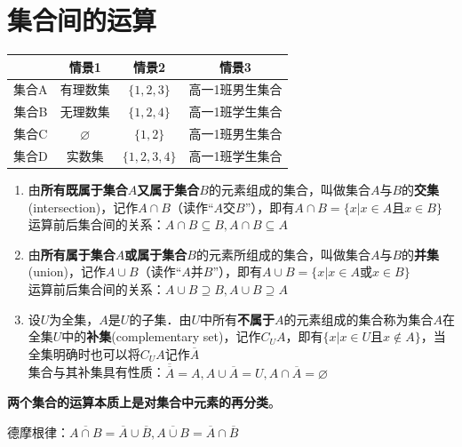 \section*{集合间的运算}
\begin{example}
    \begin{table}[h]
        \centering
        \begin{tabular}{cccc}
            \hline 
             & 情景1 & 情景2 & 情景3 \\
            \hline 
            集合A & 有理数集 & $\{1,2,3\}$ & 高一1班男生集合 \\
            集合B & 无理数集 & $\{1,2,4\}$ & 高一1班学生集合 \\
            集合C & $\varnothing$ & $\{1,2\}$ & 高一1班男生集合 \\
            集合D & 实数集 & $\{1,2,3,4\}$ & 高一1班学生集合\\
            \hline 
        \end{tabular}
    \end{table}
\end{example}
\begin{enumerate}
\item 由\textbf{所有既属于集合$A$又属于集合$B$}的元素组成的集合，叫做集合$A$与$B$的\textbf{交集}(intersection)，记作$A \cap B$（读作“$A$交$B$”），即有$A \cap B = \{x|x \in A \mbox{且} x \in B\}$ \\
运算前后集合间的关系：$A \cap B \subseteq B, A \cap B \subseteq A$
\item 由\textbf{所有属于集合$A$或属于集合$B$}的元素所组成的集合，叫做集合$A$与$B$的\textbf{并集}(union)，记作$A \cup B$（读作“$A$并$B$”），即有$A \cup B = \{x|x \in A \mbox{或} x \in B\}$ \\
运算前后集合间的关系：$A \cup B \supseteq B, A \cup B \supseteq A$
\item 设$U$为全集，$A$是$U$的子集．由$U$中所有\textbf{不属于$A$}的元素组成的集合称为集合$A$在全集$U$中的\textbf{补集}(complementary set)，记作$C_UA$，即有$\{x|x \in U \mbox{且} x \notin A\}$，当全集明确时也可以将$C_UA$记作$\overline{A}$\\
集合与其补集具有性质：$\overline{\overline{A}} = A, A \cup \overline{A} = U, A \cap \overline{A} = \varnothing$
\end{enumerate}
\textbf{两个集合的运算本质上是对集合中元素的再分类}。

德摩根律：$\overline{A \cap B}= \overline{A} \cup \overline{B}, \overline{A \cup B}= \overline{A} \cap \overline{B}$

